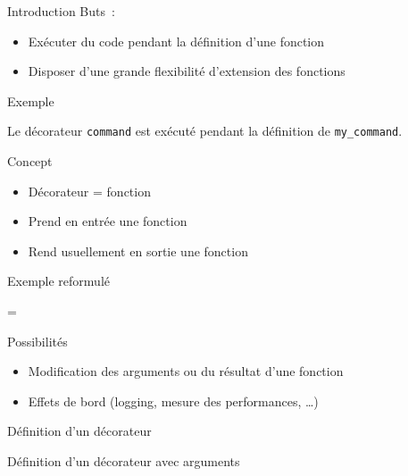 \begin{frame}{Introduction}
  Buts~:
  \begin{itemize}[<+->]
    \item Exécuter du code pendant la définition d'une fonction
    \item Disposer d'une grande flexibilité d'extension des fonctions
  \end{itemize}
\end{frame}

\begin{frame}{Exemple}

  Le décorateur \texttt{command} est exécuté pendant la définition de \texttt{my\_command}.
\end{frame}

\begin{frame}{Concept}
  \begin{itemize}[<+->]
    \item Décorateur = fonction
    \item Prend en entrée une fonction
    \item Rend usuellement en sortie une fonction
  \end{itemize}
\end{frame}

\begin{frame}{Exemple reformulé}
  \begin{center}
    {\Huge =}
  \end{center}
\end{frame}

\begin{frame}{Possibilités}
  \begin{itemize}[<+->]
    \item Modification des arguments ou du résultat d'une fonction
    \item Effets de bord (logging, mesure des performances, …)
  \end{itemize}
\end{frame}

\begin{frame}{Définition d'un décorateur}
\end{frame}

\begin{frame}{Définition d'un décorateur avec arguments}
\end{frame}

